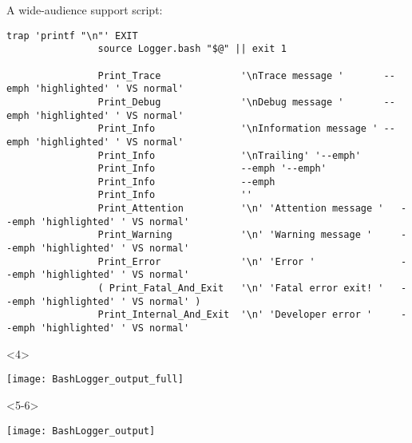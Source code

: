 \begin{frame}[fragile]{A wide-audience support script: }
\begin{overlayarea}{\textwidth}{0.8\textheight}
\begin{onlyenv}
\begin{lstlisting}[style=myBash, aboveskip=0mm, numbers=none, style=smaller, xleftmargin=0mm, xrightmargin=0mm]
                trap 'printf "\n"' EXIT
                source Logger.bash "$@" || exit 1

                Print_Trace              '\nTrace message '       --emph 'highlighted' ' VS normal'
                Print_Debug              '\nDebug message '       --emph 'highlighted' ' VS normal'
                Print_Info               '\nInformation message ' --emph 'highlighted' ' VS normal'
                Print_Info               '\nTrailing' '--emph'
                Print_Info               --emph '--emph'
                Print_Info               --emph
                Print_Info               ''
                Print_Attention          '\n' 'Attention message '   --emph 'highlighted' ' VS normal'
                Print_Warning            '\n' 'Warning message '     --emph 'highlighted' ' VS normal'
                Print_Error              '\n' 'Error '               --emph 'highlighted' ' VS normal'
                ( Print_Fatal_And_Exit   '\n' 'Fatal error exit! '   --emph 'highlighted' ' VS normal' )
                Print_Internal_And_Exit  '\n' 'Developer error '     --emph 'highlighted' ' VS normal'
            \end{lstlisting}
        \end{onlyenv}
        \begin{onlyenv}<4>
            \begin{center}
                \texttt{[image: BashLogger\_output\_full]}
            \end{center}
        \end{onlyenv}
        \begin{onlyenv}<5-6>
            \vspace{-4mm}
            \begin{center}
                \texttt{[image: BashLogger\_output]}\\[-1pt]
            \end{center}
        \end{onlyenv}
    \end{overlayarea}
\end{frame}
